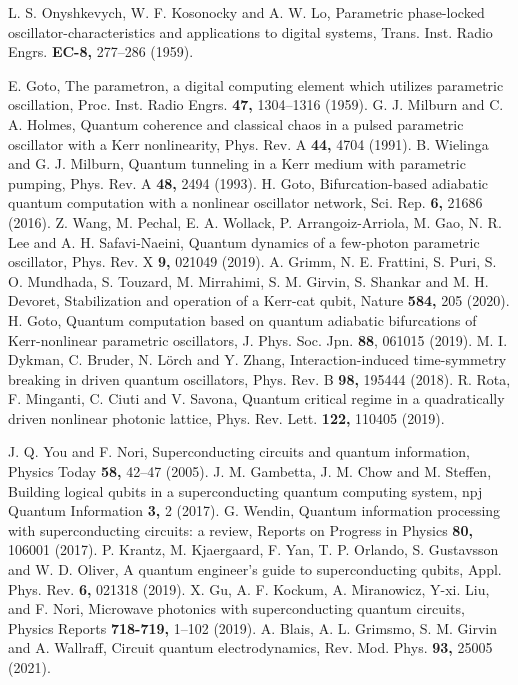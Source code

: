 \documentclass[%
 reprint,
 amsmath,amssymb,
 aps,
pra,
]{revtex4-2}
\begin{document}
\begin{thebibliography}{99}
 L. S. Onyshkevych, W. F. Kosonocky and  A. W. Lo, 
Parametric phase-locked oscillator-characteristics and applications to digital systems,
{Trans. Inst. Radio Engrs.} {\bf EC-8,} 277--286 (1959).

  E. Goto, 
The parametron, a digital computing element which utilizes parametric oscillation,
{Proc. Inst. Radio Engrs.} {\bf 47,} 1304--1316 (1959).
 G. J. Milburn and C. A. Holmes, 
Quantum coherence and classical chaos in a pulsed parametric oscillator with a Kerr nonlinearity,
Phys. Rev. A {\bf 44,} 4704 (1991).
 B. Wielinga and G. J. Milburn, 
Quantum tunneling in a Kerr medium with parametric pumping,
Phys. Rev. A {\bf 48,} 2494 (1993).
 H. Goto, 
Bifurcation-based adiabatic quantum computation with a nonlinear oscillator network,
{Sci. Rep.} {\bf 6,} 21686 (2016).
 Z. Wang, M. Pechal, E. A. Wollack, P. Arrangoiz-Arriola, M. Gao, N. R. Lee and A. H. Safavi-Naeini, 
Quantum dynamics of a few-photon parametric oscillator,
{Phys. Rev.} X  {\bf 9,} 021049 (2019).
 A. Grimm, N. E. Frattini, S. Puri, S. O. Mundhada, S. Touzard, M. Mirrahimi, S. M. Girvin, S. Shankar and M. H. Devoret, 
Stabilization and operation of a Kerr-cat qubit,
{Nature} {\bf 584,} 205 (2020).
 H. Goto, 
Quantum computation based on quantum adiabatic bifurcations of Kerr-nonlinear parametric oscillators,
J. Phys. Soc. Jpn. {\bf 88}, 061015 (2019).
 M. I. Dykman, C. Bruder, N. L\"{o}rch and Y. Zhang, 
Interaction-induced time-symmetry breaking in driven quantum oscillators,
Phys. Rev. B {\bf 98,} 195444 (2018).
 R. Rota, F. Minganti, C. Ciuti and V. Savona, 
Quantum critical regime in a quadratically driven nonlinear photonic lattice,
Phys. Rev. Lett. {\bf 122,} 110405 (2019).

 J. Q. You and F. Nori, 
Superconducting circuits and quantum information,
{Physics Today} {\bf 58,} 42--47 (2005).
 J. M. Gambetta, J. M. Chow and M. Steffen, 
Building logical qubits in a superconducting quantum computing system,
{npj Quantum Information} {\bf 3,} 2 (2017).
 G. Wendin, 
Quantum information processing with superconducting circuits: a review,
{Reports on Progress in Physics} {\bf 80,} 106001 (2017).
  P. Krantz, M. Kjaergaard, F. Yan, T. P. Orlando, S. Gustavsson and W. D. Oliver,
A quantum engineer's guide to superconducting qubits, 
{Appl. Phys. Rev.} {\bf 6,} 021318 (2019).
 X. Gu, A. F. Kockum, A. Miranowicz, Y-xi. Liu, and F. Nori, 
Microwave photonics with superconducting quantum circuits,
{Physics Reports} {\bf 718-719,} 1--102 (2019). 
 A. Blais, A. L. Grimsmo, S. M. Girvin and A. Wallraff, 
Circuit quantum electrodynamics,
{Rev. Mod. Phys.} {\bf 93,} 25005 (2021).


\end{thebibliography}
\end{document}
